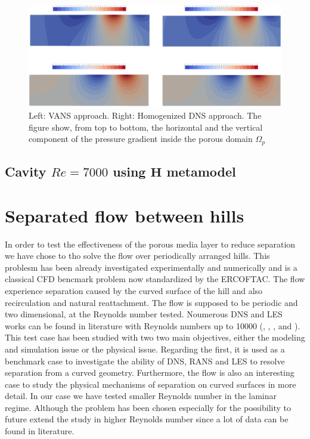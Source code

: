 \begin{figure}[h]
	\centering
	\includegraphics[width=1\linewidth]{chapter_5/figure/re1000/vans_p}
	\caption{Left: VANS approach. Right: Homogenized DNS approach. The figure show, from top to bottom, the horizontal and the vertical component of the pressure gradient inside the porous domain $\Omega_p$}
	\label{fig:1000_p}
\end{figure}


\subsection{Cavity $Re=7000$ using $\mathbf{H}$ metamodel}



\section{Separated flow between hills}
In order to test the effectiveness of the porous media layer to reduce separation we have chose to tho solve the flow over periodically arranged hills. This problesm  has been already investigated experimentally and numerically and is a classical CFD bencmark problem now standardized by the ERCOFTAC. 
The flow experience separation caused by the curved surface of the hill and also recirculation and natural reattachment. The flow is supposed to be periodic and two dimensional, at the Reynolds number tested. Noumerous DNS and LES works can be found in literature with Reynolds numbers up to 10000 (\citet{chang2014simulations}, \citet{breuer2005issues}, \citet{breuer2009flow}, \cite{almeida1993wake} and \cite{temmerman2001large}).
This test case has been studied with two two main objectives, either the modeling and simulation issue or the physical issue. Regarding the first, it is used as a benchmark case to investigate the ability of DNS, RANS and LES to resolve separation from a curved geometry. Furthermore, the flow is also an interesting case to study the physical mechanisms of separation on curved surfaces in more detail.
In our case we have tested smaller Reynolds number in the laminar regime. Although the problem has been chosen especially for the possibility to future extend the study in higher Reynolds number since a lot of data can be found in literature.

